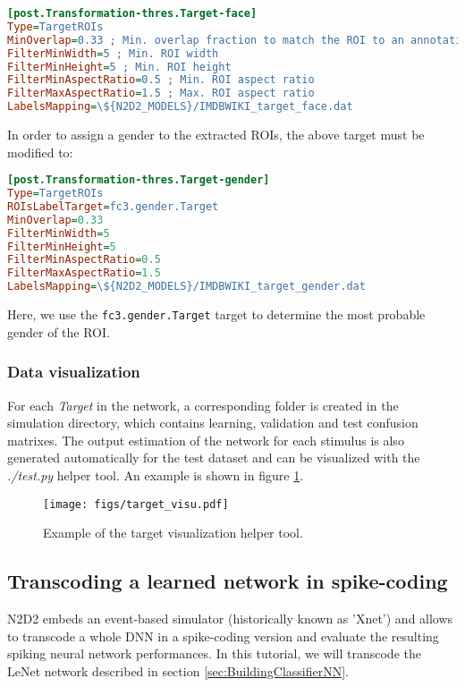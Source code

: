 \documentclass[a4paper,11pt,oneside]{article}
\begin{document}
\begin{lstlisting}[language=ini]
[post.Transformation-thres.Target-face]
Type=TargetROIs
MinOverlap=0.33 ; Min. overlap fraction to match the ROI to an annotation
FilterMinWidth=5 ; Min. ROI width
FilterMinHeight=5 ; Min. ROI height
FilterMinAspectRatio=0.5 ; Min. ROI aspect ratio
FilterMaxAspectRatio=1.5 ; Max. ROI aspect ratio
LabelsMapping=\${N2D2_MODELS}/IMDBWIKI_target_face.dat
\end{lstlisting}

In order to assign a gender to the extracted ROIs, the above target must be
modified to:

\begin{lstlisting}[language=ini]
[post.Transformation-thres.Target-gender]
Type=TargetROIs
ROIsLabelTarget=fc3.gender.Target
MinOverlap=0.33
FilterMinWidth=5
FilterMinHeight=5
FilterMinAspectRatio=0.5
FilterMaxAspectRatio=1.5
LabelsMapping=\${N2D2_MODELS}/IMDBWIKI_target_gender.dat
\end{lstlisting}

Here, we use the \lstinline!fc3.gender.Target! target to determine the most
probable gender of the ROI.

\subsubsection{Data visualization}

For each \emph{Target} in the network, a corresponding folder is created in the
simulation directory, which contains learning, validation and test confusion
matrixes. The output estimation of the network for each stimulus is also
generated automatically for the test dataset and can be visualized with the
\emph{./test.py} helper tool. An example is shown in figure
\ref{fig:targetvisu}.

\begin{figure}[!htb]
  \centering
  \texttt{[image: figs/target\_visu.pdf]}
  \caption{Example of the target visualization helper tool.}
  \label{fig:targetvisu}
\end{figure}


\subsection{Transcoding a learned network in spike-coding}

N2D2 embeds an event-based simulator (historically known as 'Xnet') and allows
to transcode a whole DNN in a spike-coding version and evaluate the resulting
spiking neural network performances. In this tutorial, we will transcode the
LeNet network described in section \ref{sec:BuildingClassifierNN}.
\end{document}

